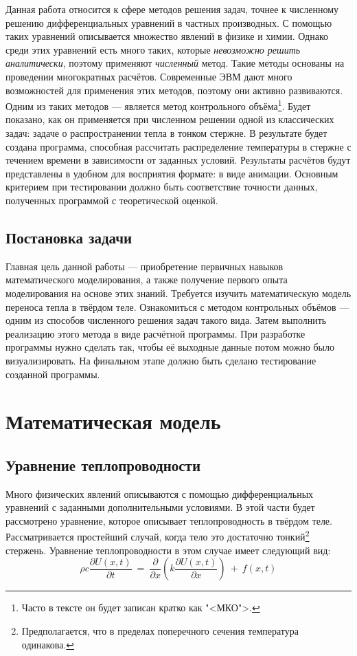 \documentclass[oneside, final, 14pt]{report}
\begin{document}
Данная работа относится к сфере методов решения задач, точнее к численному решению дифференциальных уравнений в частных производных. С помощью таких уравнений описывается множество явлений в физике и химии. Однако среди этих уравнений есть много таких, которые \emph{невозможно решить аналитически}, поэтому применяют \emph{численный} метод. Такие методы основаны на проведении многократных расчётов. Современные ЭВМ дают много возможностей для применения этих методов, поэтому они активно развиваются. Одним из таких методов --- является метод контрольного объёма\footnote{Часто в тексте он будет записан кратко как "<МКО">.}. Будет показано, как он применяется при численном решении одной из классических задач: задаче о распространении тепла в тонком стержне. В результате будет создана программа, способная рассчитать распределение температуры в стержне с течением времени в зависимости от заданных условий. Результаты расчётов будут представлены в удобном для восприятия формате: в виде анимации. Основным критерием при тестировании должно быть соответствие точности данных, полученных программой с теоретической оценкой.   
\section{Постановка задачи}
Главная цель данной работы --- приобретение первичных навыков математического моделирования, а также получение первого опыта моделирования на основе этих знаний. Требуется изучить математическую модель переноса тепла в твёрдом теле. Ознакомиться с методом контрольных объёмов --- одним из способов численного решения задач такого вида. Затем выполнить реализацию этого метода в виде расчётной программы. При разработке программы нужно сделать так, чтобы её выходные данные потом можно было визуализировать. На финальном этапе должно быть сделано тестирование созданной программы. 
\chapter{Математическая модель}
\section{Уравнение теплопроводности}
Много физических явлений описываются с помощью дифференциальных уравнений с заданными дополнительными условиями. В этой части будет рассмотрено уравнение, которое описывает теплопроводность в твёрдом теле. Рассматривается простейший случай, когда тело это достаточно тонкий\footnote{Предполагается, что в пределах поперечного сечения температура одинакова.} стержень. Уравнение теплопроводности в этом случае имеет следующий вид: 
\begin{equation}
\rho c\frac{\partial U(x,t)}{\partial t} \ = \ \frac{\partial}{\partial x}(k\frac{\partial U(x,t)}{\partial x}) \ + \ f(x,t) \label{eq_HeatTransEq} 
\end{equation}
\end{document}
